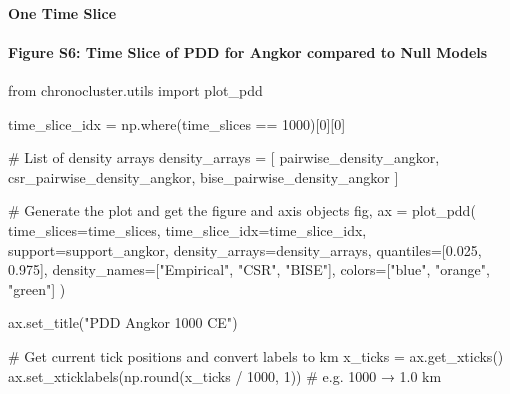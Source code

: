 \documentclass[
  11pt,
  letterpaper,
  DIV=11,
  numbers=noendperiod]{scrartcl}
\let\oldparagraph\paragraph
\renewcommand{\paragraph}[1]{\oldparagraph{#1}\mbox{}}
\newenvironment{Shaded}{\begin{snugshade}}{\end{snugshade}}
\newcommand{\BuiltInTok}[1]{\textcolor[rgb]{0.00,0.23,0.31}{#1}}
\newcommand{\CommentTok}[1]{\textcolor[rgb]{0.37,0.37,0.37}{#1}}
\newcommand{\DecValTok}[1]{\textcolor[rgb]{0.68,0.00,0.00}{#1}}
\newcommand{\FloatTok}[1]{\textcolor[rgb]{0.68,0.00,0.00}{#1}}
\newcommand{\ImportTok}[1]{\textcolor[rgb]{0.00,0.46,0.62}{#1}}
\newcommand{\NormalTok}[1]{\textcolor[rgb]{0.00,0.23,0.31}{#1}}
\newcommand{\OperatorTok}[1]{\textcolor[rgb]{0.37,0.37,0.37}{#1}}
\newcommand{\StringTok}[1]{\textcolor[rgb]{0.13,0.47,0.30}{#1}}
\begin{document}
\paragraph{One Time Slice}\label{one-time-slice}

\paragraph{Figure S6: Time Slice of PDD for Angkor compared to Null
Models}\label{figure-s6-time-slice-of-pdd-for-angkor-compared-to-null-models}

\begin{Shaded}
\begin{Highlighting}[]
\ImportTok{from}\NormalTok{ chronocluster.utils }\ImportTok{import}\NormalTok{ plot\_pdd}

\NormalTok{time\_slice\_idx }\OperatorTok{=}\NormalTok{ np.where(time\_slices }\OperatorTok{==} \DecValTok{1000}\NormalTok{)[}\DecValTok{0}\NormalTok{][}\DecValTok{0}\NormalTok{]}

\CommentTok{\# List of density arrays}
\NormalTok{density\_arrays }\OperatorTok{=}\NormalTok{ [}
\NormalTok{    pairwise\_density\_angkor, }
\NormalTok{    csr\_pairwise\_density\_angkor, }
\NormalTok{    bise\_pairwise\_density\_angkor}
\NormalTok{]}

\CommentTok{\# Generate the plot and get the figure and axis objects}
\NormalTok{fig, ax }\OperatorTok{=}\NormalTok{ plot\_pdd(}
\NormalTok{    time\_slices}\OperatorTok{=}\NormalTok{time\_slices,}
\NormalTok{    time\_slice\_idx}\OperatorTok{=}\NormalTok{time\_slice\_idx,}
\NormalTok{    support}\OperatorTok{=}\NormalTok{support\_angkor,}
\NormalTok{    density\_arrays}\OperatorTok{=}\NormalTok{density\_arrays,}
\NormalTok{    quantiles}\OperatorTok{=}\NormalTok{[}\FloatTok{0.025}\NormalTok{, }\FloatTok{0.975}\NormalTok{],}
\NormalTok{    density\_names}\OperatorTok{=}\NormalTok{[}\StringTok{"Empirical"}\NormalTok{, }\StringTok{"CSR"}\NormalTok{, }\StringTok{"BISE"}\NormalTok{],}
\NormalTok{    colors}\OperatorTok{=}\NormalTok{[}\StringTok{"blue"}\NormalTok{, }\StringTok{"orange"}\NormalTok{, }\StringTok{"green"}\NormalTok{]}
\NormalTok{)}

\NormalTok{ax.set\_title(}\StringTok{"PDD Angkor 1000 CE"}\NormalTok{)}

\CommentTok{\# Get current tick positions and convert labels to km}
\NormalTok{x\_ticks }\OperatorTok{=}\NormalTok{ ax.get\_xticks()}
\NormalTok{ax.set\_xticklabels(np.}\BuiltInTok{round}\NormalTok{(x\_ticks }\OperatorTok{/} \DecValTok{1000}\NormalTok{, }\DecValTok{1}\NormalTok{))  }\CommentTok{\# e.g. 1000 → 1.0 km}


\end{Highlighting}
\end{Shaded}
\end{document}
